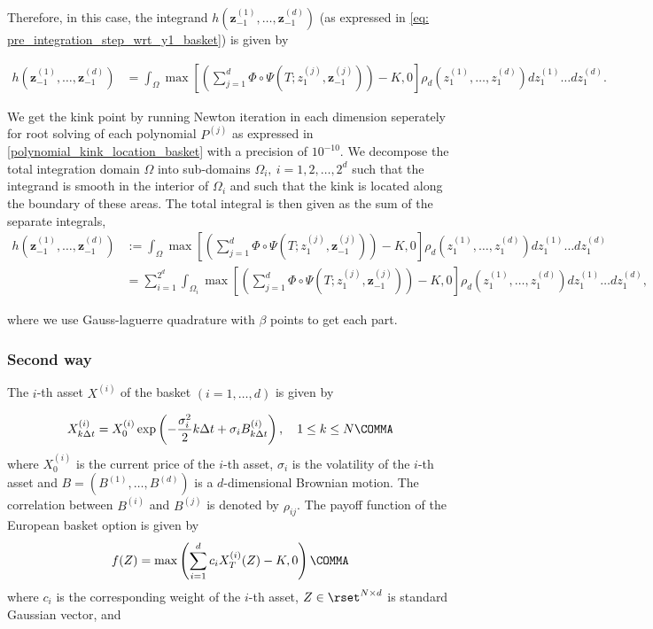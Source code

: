 Therefore, in this case, the integrand $h(\mathbf{z}^{(1)}_{-1},\dots,\mathbf{z}^{(d)}_{-1})$ (as expressed in \eqref{eq: pre_integration_step_wrt_y1_basket}) is given by

\begin{align}\label{smoothed_integrand_basket_opt_2d}
	h(\mathbf{z}^{(1)}_{-1},\dots,\mathbf{z}^{(d)}_{-1})&= \int_{\Omega}  \max  \left[ \left(\sum_{j=1}^{d} \Phi \circ \Psi(T;z_1^{(j)},\mathbf{z}^{(j)}_{-1})\right)-K,0\right]   \rho_d(z_1^{(1)},\dots,z_1^{(d)}) dz_1^{(1)}\dots dz_1^{(d)}.
\end{align}


We get the kink point by running Newton iteration in each dimension seperately for root solving of each polynomial $P^{(j)}$ as expressed in \eqref{polynomial_kink_location_basket} with a precision of $10^{-10}$. We  decompose the total integration domain $\Omega$  into sub-domains $\Omega_i,\: i=1,2,\dots, 2^d$ such that the integrand is smooth in the interior of  $\Omega_i$ and such that the kink is located along the boundary of these areas. The total integral is then given as the sum of the separate integrals, \ie
\begin{align}
	h(\mathbf{z}^{(1)}_{-1},\dots,\mathbf{z}^{(d)}_{-1}) &:=  \int_{\Omega}  \max  \left[ \left(\sum_{j=1}^{d} \Phi \circ \Psi(T;z_1^{(j)},\mathbf{z}^{(j)}_{-1})\right)-K,0\right]   \rho_d(z_1^{(1)},\dots,z_1^{(d)}) dz_1^{(1)}\dots dz_1^{(d)}  \nonumber\\
	&=\sum_{i=1}^{2^d}	\int_{\Omega_i} 
	\max  \left[ \left(\sum_{j=1}^{d} \Phi \circ \Psi(T;z_1^{(j)},\mathbf{z}^{(j)}_{-1})\right)-K,0\right]   \rho_d(z_1^{(1)},\dots,z_1^{(d)}) dz_1^{(1)}\dots dz_1^{(d)},
\end{align}

where we use Gauss-laguerre quadrature with $\beta$ points to get each part.

\FloatBarrier


\subsubsection{Second way}\label{sec: Second way}
 The $i$-th asset $X^{(i)}$ of the basket $(i=1,\dots,d)$ is given by 

\begin{equation}
X^{(i)}_{k \Delta t}=X^{(i)}_0 \exp\left( -\frac{\sigma_i^2}{2} k \Delta t +\sigma_i B^{(i)}_{k\Delta t}\right), \quad 1 \le k \le N  \COMMA
\end{equation} 
where $X^{(i)}_0$ is the current price of the $i$-th asset, $\sigma_i$ is the volatility of the $i$-th asset and $B=(B^{(1)},\dots, B^{(d)})$ is a $d$-dimensional Brownian motion. The correlation between $B^{(i)}$ and $B^{(j)}$ is denoted by $\rho_{ij}$. The payoff function of the European basket option is given by 
\begin{equation}\label{eq:basket_call_payoff}
f(Z)=\max\left(\sum_{i=1}^{d} c_i X^{(i)}_T(Z) -K,0\right)\COMMA
\end{equation}
where $c_i$ is the corresponding weight of the $i$-th asset, $Z \in \rset^{N \times d}$ is standard Gaussian  vector, and 



